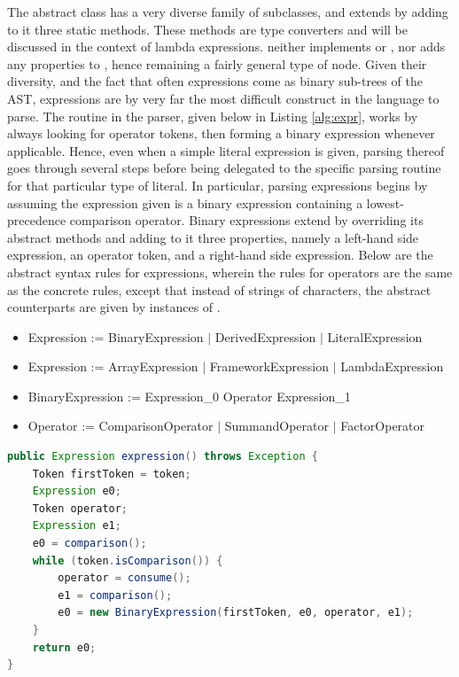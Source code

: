 The abstract class  has a very diverse family of subclasses, and extends  by adding to it three static methods. These methods are type converters and will be discussed in the context of lambda expressions.  neither implements  or , nor adds any properties to , hence remaining a fairly general type of node. Given their diversity, and the fact that often expressions come as binary sub-trees of the AST, expressions are by very far the most difficult construct in the language to parse. The  routine in the parser, given below in Listing \ref{alg:expr}, works by always looking for operator tokens, then forming a binary expression whenever applicable. Hence, even when a simple literal expression is given, parsing thereof goes through several steps before being delegated to the specific parsing routine for that particular type of literal. In particular, parsing expressions begins by assuming the expression given is a binary expression containing a lowest-precedence comparison operator. Binary expressions extend  by overriding its abstract methods and adding to it three properties, namely a left-hand side expression, an operator token, and a right-hand side expression. Below are the abstract syntax rules for expressions, wherein the rules for operators are the same as the concrete rules, except that instead of strings of characters, the abstract counterparts are given by instances of .

\begin{itemize}
	\item Expression := BinaryExpression $|$ DerivedExpression $|$ LiteralExpression
	\item Expression := ArrayExpression $|$ FrameworkExpression $|$ LambdaExpression
	\item BinaryExpression := Expression\_0 Operator Expression\_1
	\item Operator := ComparisonOperator $|$ SummandOperator $|$ FactorOperator
\end{itemize}

\begin{lstlisting}[language=Java,caption={Parsing Expressions.},label={alg:expr}]
public Expression expression() throws Exception {
	Token firstToken = token;
	Expression e0;
	Token operator;
	Expression e1;
	e0 = comparison();
	while (token.isComparison()) {
		operator = consume();
		e1 = comparison();
		e0 = new BinaryExpression(firstToken, e0, operator, e1);
	}
	return e0;
}
\end{lstlisting}

